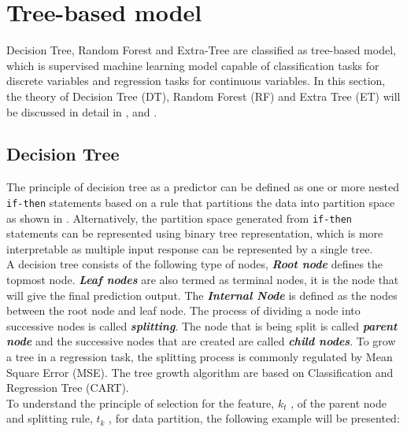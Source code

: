 \section{Tree-based model}\label{sec:tree_intro}

Decision Tree, Random Forest and Extra-Tree are classified as tree-based model, which is supervised machine learning model capable of classification tasks for discrete variables and regression tasks for continuous variables. In this section, the theory of Decision Tree (DT), Random Forest (RF) and Extra Tree (ET) will be discussed in detail in ,  and .\\  

\subsection{Decision Tree}\label{sec:dt_theo}

The principle of decision tree as a predictor can be defined as one or more nested {\tt if-then} statements based on a rule that partitions the data into partition space as shown in . Alternatively, the partition space generated from {\tt if-then} statements can be represented using binary tree representation, which is more interpretable as multiple input response can be represented by a single tree.\\ 

A decision tree consists of the following type of nodes, \textbf{\emph{Root node}} defines the topmost node. \textbf{\emph{Leaf nodes}} are also termed as terminal nodes, it is the node that will give the final prediction output. The
\textbf{\emph{Internal Node}} is defined as the nodes between the root node and leaf node. The process of dividing a node into successive nodes is called \textbf{\emph{splitting}}. The node that is being split is called \textbf{\emph{parent node}} and the successive nodes that are created are called \textbf{\emph{child nodes}}. To grow a tree in a regression task, the splitting process is commonly regulated by Mean Square Error (MSE). The tree growth algorithm are based on Classification and Regression Tree (CART).\\

To understand the principle of selection for the feature, $k_t$ , of the parent node and splitting rule, $t_k$ , for data partition, the following example will be presented:\\

